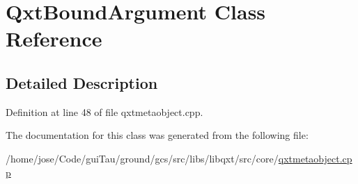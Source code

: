\hypertarget{class_qxt_bound_argument}{\section{Qxt\-Bound\-Argument Class Reference}
\label{class_qxt_bound_argument}
}


\subsection{Detailed Description}


Definition at line 48 of file qxtmetaobject.\-cpp.



The documentation for this class was generated from the following file\-:\begin{DoxyCompactItemize}
\item 
/home/jose/\-Code/gui\-Tau/ground/gcs/src/libs/libqxt/src/core/\hyperlink{qxtmetaobject_8cpp}{qxtmetaobject.\-cpp}\end{DoxyCompactItemize}
